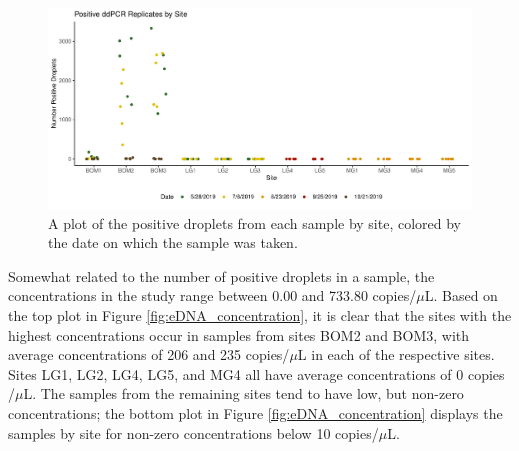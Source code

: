 \documentclass[12pt]{article}\usepackage[]{graphicx}\usepackage[]{color}
\makeatletter
\def\maxwidth{ %
  \ifdim\Gin@nat@width>\linewidth
    \linewidth
  \else
    \Gin@nat@width
  \fi
}
\newenvironment{knitrout}{}{} %
\def\maxwidth{ %
  \ifdim\Gin@nat@width>\linewidth
    \linewidth
  \else
    \Gin@nat@width
  \fi
}
\newenvironment{knitrout}{}{} %
\makeatother
\begin{document}
\begin{figure}[]
\begin{knitrout}
\color{fgcolor}

{\centering \includegraphics[width=\maxwidth]{figure/eDNA_visualization_droplets-1} 

}



\end{knitrout}
\caption{A plot of the positive droplets from each sample by site, colored by the date on which the sample was taken.}
\label{fig:eDNA_droplets}
\end{figure}

Somewhat related to the number of positive droplets in a sample, the concentrations in the study range between 0.00 and 733.80 copies/$\mu$L. Based on the top plot in Figure \ref{fig:eDNA_concentration}, it is clear that the sites with the highest concentrations occur in samples from sites BOM2 and BOM3, with average concentrations of 206 and 235 copies/$\mu$L in each of the respective sites. Sites LG1, LG2, LG4, LG5, and MG4 all have average concentrations of 0 copies /$\mu$L. The samples from the remaining sites tend to have low, but non-zero concentrations; the bottom plot in Figure \ref{fig:eDNA_concentration} displays the samples by site for non-zero concentrations below 10 copies/$\mu$L.  
\end{document}
